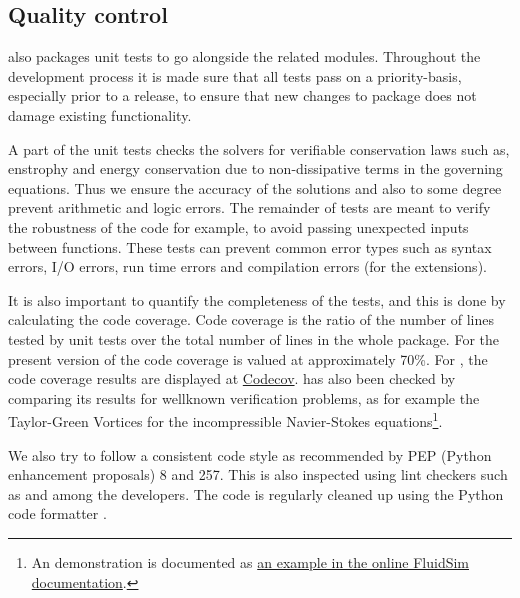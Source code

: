 \subsection{Quality control}


 also packages unit tests to go alongside the related
modules. Throughout the development process it is made sure that all tests pass
on a priority-basis, especially prior to a release, to ensure that new changes
to package does not damage existing functionality.

A part of the unit tests checks the solvers for verifiable conservation laws
such as, enstrophy and energy conservation due to non-dissipative terms in the
governing equations. Thus we ensure the accuracy of the solutions and also to
some degree prevent arithmetic and logic errors. The remainder of tests are
meant to verify the robustness of the code for example, to avoid passing
unexpected inputs between functions. These tests can prevent common error
types such as syntax errors, I/O errors, run time errors and compilation errors
(for the extensions).

It is also important to quantify the completeness of the tests, and this
is done by calculating the code coverage. Code coverage is the ratio of the
number of lines tested by unit tests over the total number of lines in the whole
package. For the present version of  the code coverage is
valued at approximately 70\%.
%
For , the code coverage results are displayed at
\href{https://codecov.io/bb/fluiddyn/fluidsim}{Codecov}.
%
 has also been checked by comparing its results for wellknown
verification problems, as for example the Taylor-Green Vortices for the
incompressible Navier-Stokes equations\footnote{An demonstration is documented
  as \href{https://fluidsim.readthedocs.io/en/latest/examples.html}{an example
  in the online FluidSim documentation}.
}.

We also try to follow a consistent code style as recommended by PEP (Python
enhancement proposals) 8 and 257. This is also inspected using lint
checkers such as  and  among the
developers. The code is regularly cleaned up using the Python code formatter
.

